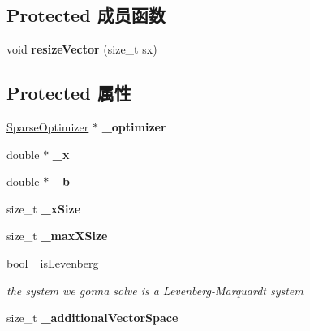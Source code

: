 \subsection*{Protected 成员函数}
\begin{DoxyCompactItemize}
\item 
\hypertarget{classg2o_1_1Solver_ad1f85839e85f3e2c49112fb7e2b843ad}{void {\bfseries resize\-Vector} (size\-\_\-t sx)}\label{classg2o_1_1Solver_ad1f85839e85f3e2c49112fb7e2b843ad}

\end{DoxyCompactItemize}
\subsection*{Protected 属性}
\begin{DoxyCompactItemize}
\item 
\hypertarget{classg2o_1_1Solver_aff3275985d996329df15070348c21292}{\hyperlink{classg2o_1_1SparseOptimizer}{Sparse\-Optimizer} $\ast$ {\bfseries \-\_\-optimizer}}\label{classg2o_1_1Solver_aff3275985d996329df15070348c21292}

\item 
\hypertarget{classg2o_1_1Solver_a94ee5e303a754f4ff338a7b032c214ae}{double $\ast$ {\bfseries \-\_\-x}}\label{classg2o_1_1Solver_a94ee5e303a754f4ff338a7b032c214ae}

\item 
\hypertarget{classg2o_1_1Solver_a52c92c9bf5db0da3322da3a02dbeb245}{double $\ast$ {\bfseries \-\_\-b}}\label{classg2o_1_1Solver_a52c92c9bf5db0da3322da3a02dbeb245}

\item 
\hypertarget{classg2o_1_1Solver_abcf7731347f14915bd9ba963021ea830}{size\-\_\-t {\bfseries \-\_\-x\-Size}}\label{classg2o_1_1Solver_abcf7731347f14915bd9ba963021ea830}

\item 
\hypertarget{classg2o_1_1Solver_a263003f9053537f92d5d019ce5c53771}{size\-\_\-t {\bfseries \-\_\-max\-X\-Size}}\label{classg2o_1_1Solver_a263003f9053537f92d5d019ce5c53771}

\item 
\hypertarget{classg2o_1_1Solver_a8b7f6d4e00e3734f5ed9bd3dfac201a6}{bool \hyperlink{classg2o_1_1Solver_a8b7f6d4e00e3734f5ed9bd3dfac201a6}{\-\_\-is\-Levenberg}}\label{classg2o_1_1Solver_a8b7f6d4e00e3734f5ed9bd3dfac201a6}

\begin{DoxyCompactList}\small\item\em the system we gonna solve is a Levenberg-\/\-Marquardt system \end{DoxyCompactList}\item 
\hypertarget{classg2o_1_1Solver_a6a1492959487c279747a8f3097a5f04e}{size\-\_\-t {\bfseries \-\_\-additional\-Vector\-Space}}\label{classg2o_1_1Solver_a6a1492959487c279747a8f3097a5f04e}

\end{DoxyCompactItemize}


